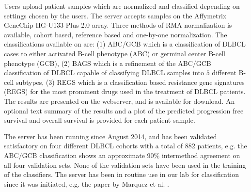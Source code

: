Users upload patient samples which are normalized and classified depending on settings chosen by the users. The server accepts samples on the Affymetrix GeneChip HG-U133 Plus 2.0 array. Three  methods of RMA normalization is available, cohort based, reference based and one-by-one normalization. The classifications available on \hemaClass{} are:
(1) ABC/GCB \cite{Alizadeh2000} which is a classification of DLBCL cases to either activated B-cell phenotype (ABC) or germinal center B-cell phenotype (GCB),
(2) BAGS \cite{DybkaerBoegsted2015} which is a refinement of the ABC/GCB classification of DLBCL capable of classifying DLBCL samples into $5$ different B-cell subtypes,
(3) REGS \cite{Falgreen2015} which is a classification based resistance gene signatures (REGS) for the most prominent drugs used in the treatment of DLBCL patients.
The results are presented on the webserver, and is available for download. An optional text summary of the results and a plot of the predicted progression free survival and overall survival is provided for each patient sample.

The server has been running since August 2014, and has been validated satisfactory on four different DLBCL cohorts with a total of 882 patients, e.g. the ABC/GCB classification shows an approximate 90\% intermethod agreement on all four validation sets. None of the validation sets have been used in the training of the classifiers. The server has been in routine use in our lab for classification since it was initiated, e.g. the paper by Marquez et al. \cite{}.

\newpage




